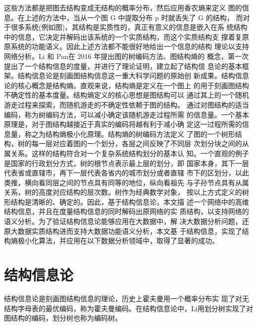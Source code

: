\documentclass[a4paper]{apa6}
\begin{document}
这些方法都是把图去结构变成无结构的概率分布，然后应用香农熵来定义 图的信息。在上述的方法中，当从一个图 G 中提取分布 p 时就丢失了 G 的结构， 而对于很多系统(例如图)，其结构是实质性的，真正有意义的信息是嵌入在系 统结构中的信息，它决定并解码出该系统的一个实质结构，而这个实质结构支 撑着复原原系统的功能语义。因此上述方法都不能很好地给出一个信息的结构 理论以支持网络分析。Li 和 Pan\citep{li_structural_2016}在 2016 年提出图的树编码方法、图结构熵的 概念，第一次提出了一个结构信息的度量，并进行了理论证明，建立起了结构信 息论的基本框架。结构信息论\citep{li_structural_2016}是刻画图结构信息这一重大科学问题的原始创 新成果。结构信息论的核心概念是结构熵。直观来说，结构熵是定义在一个图上 的用于刻画图结构不确定性的基本度量。结构熵定义的核心思想是图结构可以 通过其上的一个随机游走过程来探索，而随机游走的不确定性依赖于图的结构。 通过对图结构的适当编码，称为树编码方法，可以减小确定该随机游走过程所需 的信息量。一个基本原理是，对于图结构越接近于真实的编码将越有利于减小确 定这一过程所需的信息量，称之为结构熵极小化原理。结构熵的树编码方法定义 了图的一个树形结构，树的每一层对应着图的一个划分，各层之间反映了不同层 次划分块之间的从属关系。这样的结构符合对一个复杂系统结构划分的基本认 知。一个直观的例子是国家的行政划分方式，树的根节点表示最上层的划分，即 国家本身，其下一层代表省或直辖市，再下一层代表各省内的城市划分或者直辖 市下的区划分，以此类推，横向看同层之间的节点具有同等的地位，纵向看祖先 与子孙节点具有从属关系，树的高度对应结构的层次数。树作为经典数学对象， 按以上方式定义的树形结构是清晰的、确定的。因此，基于结构信息论，本文描 述一个网络中的高维结构信息，并且在度量结构信息的同时解码出原网络的实 质结构，以支持网络的语义分析。为了验证结构信息论能够应用在大数据中，解 决大数据分析问题，还原大数据实质结构进而支持大数据功能语义分析，本文基 于结构信息，实现了结构熵极小化算法，并应用在以下数据分析领域中，取得了显著的成功。

\section{结构信息论}
\label{sec:org819b224}
结构信息论\citep{li_structural_2016}是刻画图结构信息的理论，历史上霍夫曼用一个概率分布实 现了对无结构字母表的最优编码，称为霍夫曼编码。在结构信息论中，Li\citep{li_structural_2016}用划分树实现了对图结构的编码，划分树也称为编码树。
\end{document}
